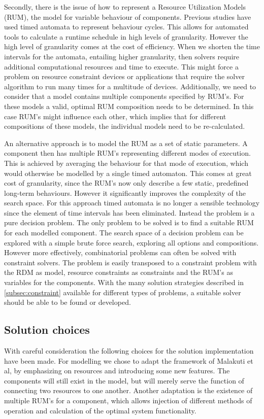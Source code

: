 Secondly, there is the issue of how to represent a Resource Utilization Models (RUM)\cite{steven-te-brinke}, the model for variable behaviour of components. Previous studies \cite{rum_basis_89, steven-te-brinke} have used timed automata to represent behaviour cycles. This allows for automated tools to calculate a runtime schedule in high levels of granularity. However the high level of granularity comes at the cost of efficiency. When we shorten the time intervals for the automata, entailing higher granularity, then solvers require additional computational resources and time to execute. This might force a problem on resource constraint devices or applications that require the solver algorithm to run many times for a multitude of devices. Additionally, we need to consider that a model contains multiple components specified by RUM's. For these models a valid, optimal RUM composition needs to be determined. In this case RUM's might influence each other, which implies that for different compositions of these models, the individual models need to be re-calculated. %

An alternative approach is to model the RUM as a set of static parameters. A component then has multiple RUM's representing different modes of execution. This is achieved by averaging the behaviour for that mode of execution, which would otherwise be modelled by a single timed automaton. This comes at great cost of granularity, since the RUM's now only describe a few static, predefined long-term behaviours. However it significantly improves the complexity of the search space. For this approach timed automata is no longer a sensible technology since the element of time intervals has been eliminated. Instead the problem is a pure decision problem\cite{decision_problem}. The only problem to be solved is to find a suitable RUM for each modelled component. The search space of a decision problem can be explored with a simple brute force search, exploring all options and compositions. However more effectively, combinatorial problems can often be solved with constraint solvers. The problem is easily transposed to a constraint problem with the RDM as model, resource constraints as constraints and the RUM's as variables for the components. With the many solution strategies described in \ref{subsec:constraint} available for different types of problems, a suitable solver should be able to be found or developed.

\subsection{Solution choices}
\label{sub:choices}
With careful consideration the following choices for the solution implementation have been made. For modelling we chose to adapt the framework of Malakuti et al\cite{steven_te_brinke}, by emphasizing on resources and introducing some new features. The components will still exist in the model, but will merely serve the function of connecting two resources to one another. Another adaptation is the existence of multiple RUM's for a component, which allows injection of different methods of operation and calculation of the optimal system functionality.

